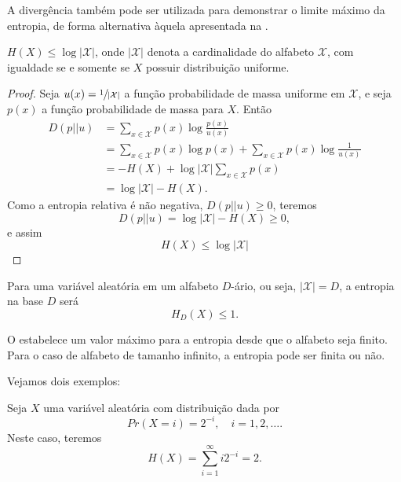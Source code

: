 A divergência também pode ser utilizada para demonstrar o limite máximo da entropia,
de forma alternativa àquela apresentada na .
\begin{theorem}\label{thm-limmaxentro}
$H(X) \leq \log \vert \mathcal{X} \vert$, onde $\vert \mathcal{X} \vert$ denota a cardinalidade
do alfabeto $\mathcal{X}$, com igualdade se e somente se $X$ possuir distribuição uniforme.
\end{theorem}
\begin{proof}
Seja $u(x) = \sfrac{1}{\vert \mathcal{X} \vert}$ a função probabilidade de massa uniforme
em $\mathcal{X}$, e seja $p(x)$ a função probabilidade de massa para $X$. Então
\begin{align}
D(p||u) &= \sum_{x \in \mathcal{X}} p(x) \log \frac{p(x)}{u(x)} \nonumber \\
        &= \sum_{x \in \mathcal{X}} p(x) \log p(x) + \sum_{x \in \mathcal{X}} p(x) \log \frac{1}{u(x)} \nonumber \\
        &= -H(X) + \log \vert \mathcal{X} \vert \sum_{x \in \mathcal{X}} p(x) \nonumber \\
        &= \log \vert \mathcal{X} \vert - H(X) .
\end{align}
Como a entropia relativa é não negativa, $D(p||u) \geq 0$, teremos
\begin{equation}
D(p||u) = \log \vert \mathcal{X} \vert - H(X) \geq 0 ,
\end{equation}
e assim
\begin{equation}
H(X) \leq \log \vert \mathcal{X} \vert
\end{equation}	
\end{proof}


\begin{remark}
  Para uma variável aleatória em um alfabeto $D$-ário, ou seja, $\vert \mathcal{X} \vert = D$, 
  a entropia na base $D$ será
  \begin{equation}
    H_D (X) \leq 1 .
  \end{equation}
\end{remark}

\begin{remark}
  O  estabelece um valor máximo para a entropia desde que o alfabeto seja finito.
  Para o caso de alfabeto de tamanho infinito, a entropia pode ser finita ou não.
\end{remark}

Vejamos dois exemplos:
\begin{example}
  Seja $X$ uma variável aleatória com distribuição dada por
  \begin{equation}
    Pr(X=i) = 2^{-i}, \quad i=1,2,\ldots .
  \end{equation}
  Neste caso, teremos
  \begin{equation}
    H(X) = \sum_{i=1}^{\infty} i 2^{-i} = 2 .
  \end{equation}
\end{example}

